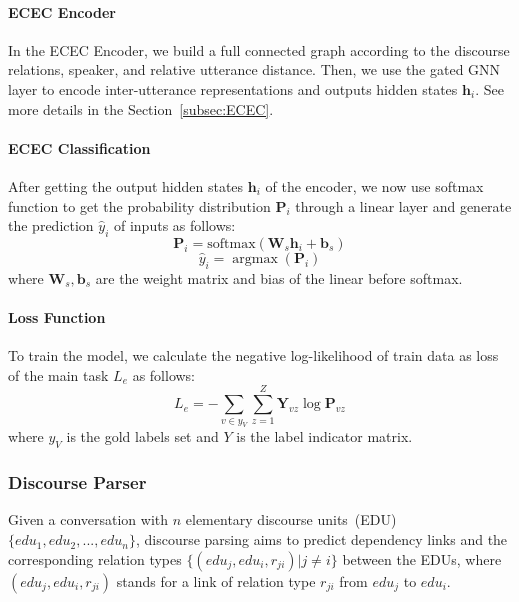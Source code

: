 \documentclass[11pt]{article}
\begin{document}
\paragraph{ECEC Encoder}
In the ECEC Encoder, we build a full connected graph according to the discourse relations, speaker, and relative utterance distance.
Then, we use the gated GNN layer to encode inter-utterance representations and outputs hidden states $\mathbf{h}_i$.
See more details in the Section~\ref{subsec:ECEC}.

\paragraph{ECEC Classification}
After getting the output hidden states $\mathbf{h}_i$ of the encoder, 
we now use softmax function to get the probability distribution $\mathbf{P}_i$ through a linear layer and generate the prediction $\widehat{y}_i$ of inputs as follows:
\begin{equation}
\mathbf{P}_i=\mathrm{softmax}(\mathbf{W}_s \mathbf{h}_i+\mathbf{b}_s)
\end{equation}
\begin{equation}
\widehat{y}_i=\mathop{\arg\max}(\mathbf{P}_i)
\end{equation}
where $\mathbf{W}_s, \mathbf{b}_s$ are the weight matrix and bias of the linear before softmax.

\paragraph{Loss Function}
To train the model, we calculate the negative log-likelihood of train data as loss of the main task $L_e$ as follows:
\begin{equation}
L_e= - \sum_{v \in y_V} \sum_{z=1}^Z \mathbf{Y}_{vz} \log \mathbf{P}_{vz}
\end{equation}
where $y_V$ is the gold labels set and $Y$ is the label indicator matrix.

\subsubsection{Discourse Parser}

Given a conversation with $n$ elementary discourse units~(EDU) $\{edu_1, edu_2, ..., edu_n\}$, 
discourse parsing aims to predict dependency links and the corresponding relation types $\{(edu_j, edu_i, r_{ji})|j \neq i\}$ between the EDUs, where $(edu_j, edu_i, r_{ji})$ stands for a link of relation type $r_{ji}$ from $edu_j$ to $edu_i$.
\end{document}
